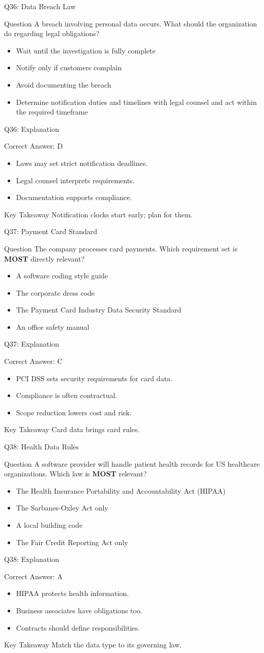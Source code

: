 \documentclass[aspectratio=169]{beamer}
\newcommand{\hq}[7]{%
	\begin{frame}{Q#1: #2}
		\begin{block}{Question}
			#3
		\end{block}
		\begin{itemize}
			#4
		\end{itemize}
	\end{frame}
	\begin{frame}{Q#1: Explanation}
		\begin{block}{Correct Answer: #5}
			\begin{itemize}
				#6
			\end{itemize}
		\end{block}
		\begin{alertblock}{Key Takeaway}
			#7
		\end{alertblock}
	\end{frame}
}
\begin{document}
	\hq{36}{Data Breach Law}
	{A breach involving personal data occurs. What should the organization do regarding legal obligations?}
	{\item[\textbf{(A)}] Wait until the investigation is fully complete
		\item[\textbf{(B)}] Notify only if customers complain
		\item[\textbf{(C)}] Avoid documenting the breach
		\item[\textbf{(D)}] Determine notification duties and timelines with legal counsel and act within the required timeframe}
	{D}
	{\item Laws may set strict notification deadlines.
		\item Legal counsel interprets requirements.
		\item Documentation supports compliance.}
	{Notification clocks start early; plan for them.}
	
	\hq{37}{Payment Card Standard}
	{The company processes card payments. Which requirement set is \textbf{MOST} directly relevant?}
	{\item[\textbf{(A)}] A software coding style guide
		\item[\textbf{(B)}] The corporate dress code
		\item[\textbf{(C)}] The Payment Card Industry Data Security Standard
		\item[\textbf{(D)}] An office safety manual}
	{C}
	{\item PCI DSS sets security requirements for card data.
		\item Compliance is often contractual.
		\item Scope reduction lowers cost and risk.}
	{Card data brings card rules.}
	
	\hq{38}{Health Data Rules}
	{A software provider will handle patient health records for US healthcare organizations. Which law is \textbf{MOST} relevant?}
	{\item[\textbf{(A)}] The Health Insurance Portability and Accountability Act (HIPAA)
		\item[\textbf{(B)}] The Sarbanes-Oxley Act only
		\item[\textbf{(C)}] A local building code
		\item[\textbf{(D)}] The Fair Credit Reporting Act only}
	{A}
	{\item HIPAA protects health information.
		\item Business associates have obligations too.
		\item Contracts should define responsibilities.}
	{Match the data type to its governing law.}
	
\end{document}
